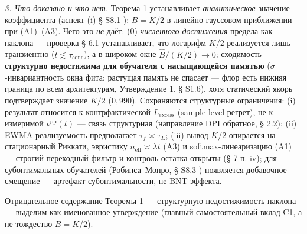 \documentclass[12pt]{iopart}
\begin{document}
\emph{3. Что доказано и что нет.} Теорема 1 устанавливает \emph{аналитическое} значение коэффициента (аспект (i) § S8.1 \cite{Andriishin2026b}): \(B = K/2\) в линейно-гауссовом приближении при (A1)--(A3). Чего это \emph{не} даёт: (0) \emph{численного достижения} предела как наклона --- проверка § 6.1 устанавливает, что логарифм \(K/2\) реализуется лишь транзиентно (\(t \lesssim \tau_{\text{conc}}\)), а в широком окне \(\hat B/(K/2) \to 0\); сходимость \textbf{структурно недостижима для обучателя с насыщающейся памятью} (\(\sigma\)-инвариантность окна фита; растущая память не спасает --- флор есть нижняя граница по всем архитектурам, Утверждение 1, § S1.6), хотя статический якорь подтверждает значение \(K/2\) (\(0{,}990\)). Сохраняются структурные ограничения: (i) результат относится к контрфактической \(L_{\text{excess}}\) (sample-level регрет), не к измеримой \(\nu^{\text{op}}(t)\) --- связь структурная (направление DPI обратное, § 2.2); (ii) EWMA-реализуемость предполагает \(\tau_f \asymp \tau_E\); (iii) вывод \(K/2\) опирается на стационарный Риккати, эвристику \(n_{\text{eff}} \asymp \lambda t\) (A3) и softmax-линеаризацию (A1) --- строгий переходный фильтр и контроль остатка открыты (§ 7 п. iv); для субоптимальных обучателей (Робинса--Монро, § S8.3 \cite{Andriishin2026b}) появляется добавочное смещение --- артефакт субоптимальности, не BNT-эффекта.



Отрицательное содержание Теоремы 1 --- структурную недостижимость наклона --- выделим как именованное утверждение (главный самостоятельный вклад C1, а не тождество \(B=K/2\)).
\end{document}
